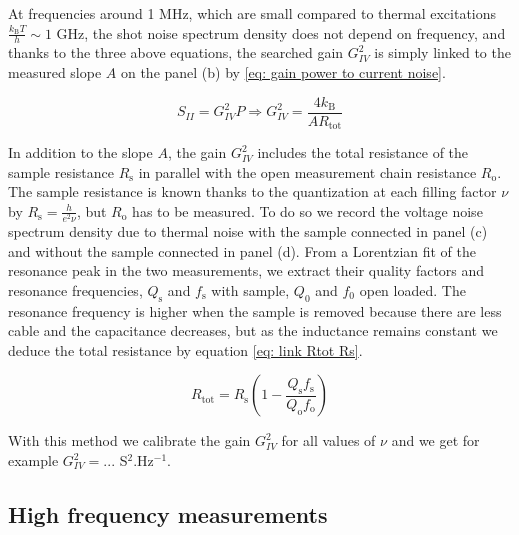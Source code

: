 At frequencies around 1 MHz, which are small compared to thermal excitations $\frac{k_{\mathrm{B}}T}{h} \sim 1$ GHz, the shot noise spectrum density does not depend on frequency, and thanks to the three above equations, the searched gain $G_{IV}^{2}$ is simply linked to the measured slope $A$ on the panel (b) by \eqref{eq: gain power to current noise}.

\begin{equation}
S_{II} = G_{IV}^{2}P \Rightarrow G_{IV}^{2} = \frac{4k_{\mathrm{B}}}{AR_{\mathrm{tot}}} \label{eq: gain power to current noise}
\end{equation}

In addition to the slope $A$, the gain $G_{IV}^{2}$ includes the total resistance of the sample resistance $R_{\mathrm{s}}$ in parallel with the open measurement chain resistance $R_{\mathrm{o}}$.
The sample resistance is known thanks to the quantization at each filling factor $\nu$ by $R_{\mathrm{s}} = \frac{h}{e^{2}\nu}$, but $R_{\mathrm{o}}$ has to be measured.
To do so we record the voltage noise spectrum density due to thermal noise with the sample connected in panel (c) and without the sample connected in panel (d).
From a Lorentzian fit of the resonance peak in the two measurements, we extract their quality factors and resonance frequencies, $Q_{\mathrm{s}}$ and $f_{\mathrm{s}}$ with sample, $Q_{\mathrm{0}}$ and $f_{\mathrm{0}}$ open loaded.
The resonance frequency is higher when the sample is removed because there are less cable and the capacitance decreases, but as the inductance remains constant we deduce the total resistance by equation \eqref{eq: link Rtot Rs}.

\begin{equation}
R_{\mathrm{tot}} = R_{\mathrm{s}}\left(1-\frac{Q_{\mathrm{s}}f_{\mathrm{s}}}{Q_{\mathrm{o}}f_{\mathrm{o}}}\right) \label{eq: link Rtot Rs}
\end{equation}

With this method we calibrate the gain $G_{IV}^{2}$ for all values of $\nu$ and we get for example $G_{IV}^{2} = ...$ S$^{2}$.Hz$^{-1}$.

\subsection{High frequency measurements}

